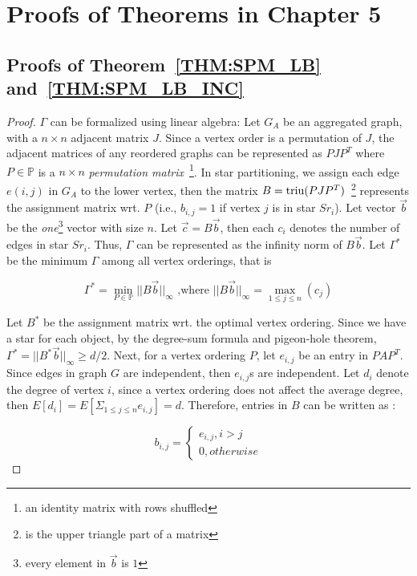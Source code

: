 \section{Proofs of Theorems in Chapter 5}
\subsection{Proofs of Theorem~\ref{THM:SPM_LB} and~\ref{THM:SPM_LB_INC}}
\label{apx:thm2proof}

\begin{proof}
$\Gamma$ can be formalized using linear algebra:
Let $G_A$ be an aggregated graph, with a $n \times n$ adjacent matrix $J$.
Since a vertex order is a permutation of $J$, the adjacent matrices 
of any reordered graphs can be represented as $PJP^T$
where $P \in \mathbb{P}$ is a $n\times n$ \emph{permutation matrix}~\footnote{an identity matrix with rows shuffled}.
In star partitioning, we assign each edge $e(i,j)$ in $G_A$ to the lower vertex, 
then the matrix $B=\operatorname*{triu}(PJP^T)$~\footnote{ is the upper triangle part of a matrix}
represents the assignment matrix wrt. $P$ (i.e., $b_{i,j} = 1$ if vertex $j$ is in star $Sr_i$).
Let vector $\vec{b}$ be the \textit{one}\footnote{every element in $\vec{b}$ is $1$} 
vector with size $n$. Let $\vec{c} = B\vec{b}$, then each $c_i$ 
denotes the number of edges in star $Sr_i$. Thus, $\Gamma$ can be represented
as the infinity norm of $B\vec{b}$. Let $\Gamma^*$ be the minimum $\Gamma$ among all vertex orderings, that is

\begin{equation}
\Gamma^* = \min_{P \in \mathbb{P}}{||B\vec{b}||_\infty} \text{ ,where } ||B\vec{b}||_\infty = \max_{1\leq j \leq n}(c_j)
\end{equation}

Let $B^*$ be the assignment matrix wrt. the optimal vertex ordering.
Since we have a star for each object, by the degree-sum formula and pigeon-hole theorem, 
$\Gamma^*=||B^*\vec{b}||_\infty \geq d/2$.
Next, for a vertex ordering $P$, let $e_{i,j}$ be an entry in $PAP^T$. Since 
edges in graph $G$ are independent, then $e_{i,j}$s are independent. 
Let $d_i$ denote the degree of vertex $i$, since a vertex ordering does not
affect the average degree,
then $E[d_i]=E[\Sigma_{1\leq j \leq n}e_{i,j}]=d$. Therefore, 
entries in $B$ can be written as :

\begin{equation*}
b_{i,j} = \begin{cases}
			e_{i,j}, i>j \\
			0, otherwise
		  \end{cases}  
\end{equation*}


\end{proof}
